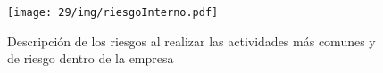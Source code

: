     \begin{figure}[H]
        \centering
        \texttt{[image: 29/img/riesgoInterno.pdf]}
        \caption{Descripción de los riesgos al realizar las actividades más comunes y de riesgo dentro de la empresa}
    \end{figure}
